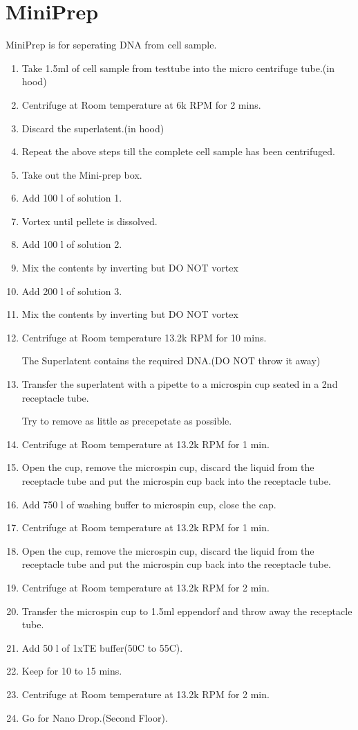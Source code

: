 \documentclass[11pt,twoside,a4paper]{article}
\begin{document}
\section{MiniPrep}
MiniPrep is for seperating DNA from cell sample.
\begin{enumerate}
	\item Take 1.5ml of cell sample from testtube into the micro centrifuge tube.(in hood)
	\item Centrifuge at Room temperature at 6k RPM for 2 mins.
	\item Discard the superlatent.(in hood)
	\item Repeat the above steps till the complete cell sample has been centrifuged.
	\item Take out the Mini-prep box.
	\item Add 100 \textmu{} l of solution 1.
	\item Vortex until pellete is dissolved.
	\item Add 100 \textmu{} l of solution 2.
	\item Mix the contents by inverting but DO NOT vortex
	\item Add 200 \textmu{} l of solution 3.
	\item Mix the contents by inverting but DO NOT vortex
	\item Centrifuge at Room temperature 13.2k RPM for 10 mins.

		The Superlatent contains the required DNA.(DO NOT throw it away)
	\item Transfer the superlatent with a pipette to a microspin cup seated in a 2nd receptacle tube.

		Try to remove as little as precepetate as possible.
	\item Centrifuge at Room temperature at 13.2k RPM for 1 min.
	\item Open the cup, remove the microspin cup, discard the liquid from the receptacle tube and put the microspin cup back into the receptacle tube.
	\item Add 750 \textmu{} l of washing buffer to microspin cup, close the cap.
	\item Centrifuge at Room temperature at 13.2k RPM for 1 min.
	\item Open the cup, remove the microspin cup, discard the liquid from the receptacle tube and put the microspin cup back into the receptacle tube.
	\item Centrifuge at Room temperature at 13.2k RPM for 2 min.
	\item Transfer the microspin cup to 1.5ml eppendorf and throw away the receptacle tube.
	\item Add 50 \textmu{} l of 1xTE buffer(50\textdegree C to 55\textdegree C).
	\item Keep for 10 to 15 mins.
	\item Centrifuge at Room temperature at 13.2k RPM for 2 min.
	\item Go for Nano Drop.(Second Floor).
\end{enumerate}
\end{document}
